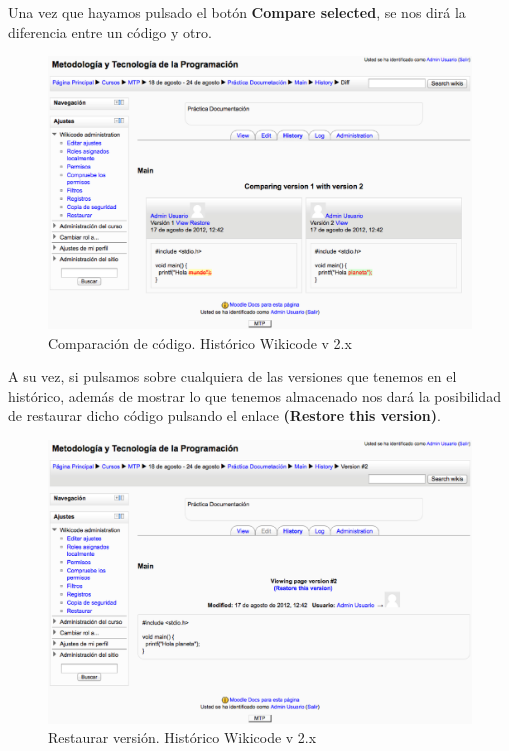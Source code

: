 \newpage

Una vez que hayamos pulsado el botón \textbf{Compare selected}, se nos dirá la diferencia entre un código y otro.

\vspace{1cm}

\begin{figure}[h]
	\label{v2history2.eps}
	\includegraphics[width=\textwidth]{./img/v2history2.eps}
	\caption{Comparación de código. Histórico Wikicode v 2.x}
\end{figure}

\newpage

A su vez, si pulsamos sobre cualquiera de las versiones que tenemos en el histórico, además de mostrar lo que tenemos almacenado nos dará la posibilidad de restaurar dicho código pulsando el enlace \textbf{(Restore this version)}.

\vspace{1cm}

\begin{figure}[h]
	\label{v2history3.eps}
	\includegraphics[width=\textwidth]{./img/v2history3.eps}
	\caption{Restaurar versión. Histórico Wikicode v 2.x}
\end{figure}

